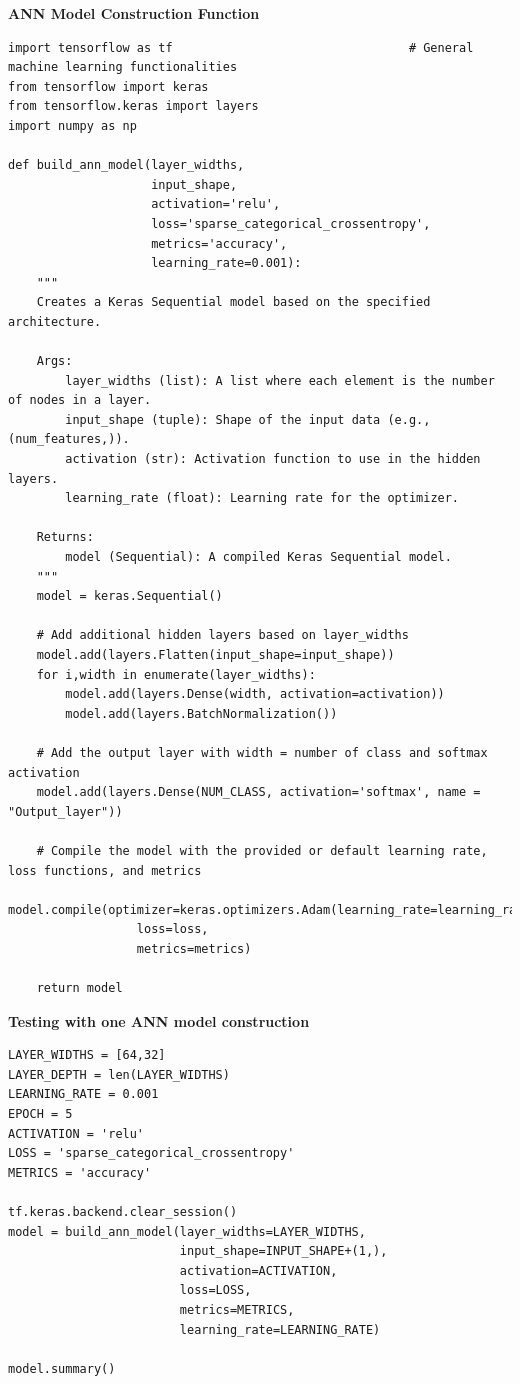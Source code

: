 \documentclass[a4paper]{article}
\begin{document}
\textbf{ANN Model Construction Function}

\begin{lstlisting}
import tensorflow as tf                                 # General machine learning functionalities                    
from tensorflow import keras
from tensorflow.keras import layers
import numpy as np

def build_ann_model(layer_widths, 
                    input_shape, 
                    activation='relu', 
                    loss='sparse_categorical_crossentropy', 
                    metrics='accuracy', 
                    learning_rate=0.001):
    """
    Creates a Keras Sequential model based on the specified architecture.

    Args:
        layer_widths (list): A list where each element is the number of nodes in a layer.
        input_shape (tuple): Shape of the input data (e.g., (num_features,)).
        activation (str): Activation function to use in the hidden layers.
        learning_rate (float): Learning rate for the optimizer.

    Returns:
        model (Sequential): A compiled Keras Sequential model.
    """
    model = keras.Sequential()

    # Add additional hidden layers based on layer_widths
    model.add(layers.Flatten(input_shape=input_shape))
    for i,width in enumerate(layer_widths):
        model.add(layers.Dense(width, activation=activation))
        model.add(layers.BatchNormalization())

    # Add the output layer with width = number of class and softmax activation
    model.add(layers.Dense(NUM_CLASS, activation='softmax', name = "Output_layer"))

    # Compile the model with the provided or default learning rate, loss functions, and metrics
    model.compile(optimizer=keras.optimizers.Adam(learning_rate=learning_rate), 
                  loss=loss, 
                  metrics=metrics)
    
    return model
\end{lstlisting}

\textbf{Testing with one ANN model construction}
\begin{lstlisting}
LAYER_WIDTHS = [64,32]
LAYER_DEPTH = len(LAYER_WIDTHS)
LEARNING_RATE = 0.001
EPOCH = 5
ACTIVATION = 'relu'
LOSS = 'sparse_categorical_crossentropy'
METRICS = 'accuracy'

tf.keras.backend.clear_session()
model = build_ann_model(layer_widths=LAYER_WIDTHS,
                        input_shape=INPUT_SHAPE+(1,),
                        activation=ACTIVATION,
                        loss=LOSS,
                        metrics=METRICS,
                        learning_rate=LEARNING_RATE)

model.summary()
\end{lstlisting}
\end{document}
